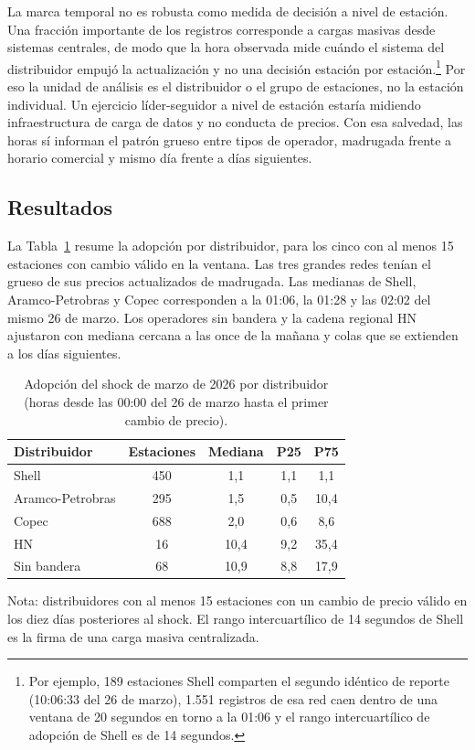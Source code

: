 \documentclass[11pt]{article}
\begin{document}
La marca temporal no es robusta como medida de decisión a nivel de estación.
Una fracción importante de los registros corresponde a cargas masivas desde
sistemas centrales, de modo que la hora observada mide cuándo el sistema del
distribuidor empujó la actualización y no una decisión estación por
estación.\footnote{Por ejemplo, 189 estaciones Shell comparten el segundo
idéntico de reporte (10:06:33 del 26 de marzo), 1.551 registros de esa red
caen dentro de una ventana de 20 segundos en torno a la 01:06 y el rango
intercuartílico de adopción de Shell es de 14 segundos.} Por eso la unidad
de análisis es el distribuidor o el grupo de estaciones, no la estación
individual. Un ejercicio líder-seguidor a nivel de estación estaría midiendo
infraestructura de carga de datos y no conducta de precios. Con esa
salvedad, las horas sí informan el patrón grueso entre tipos de operador,
madrugada frente a horario comercial y mismo día frente a días siguientes.

\subsection{Resultados}
\label{sec:lider_resultados}

La Tabla~\ref{tab:lider_dist} resume la adopción por distribuidor, para los
cinco con al menos 15 estaciones con cambio válido en la ventana. Las tres
grandes redes tenían el grueso de sus precios actualizados de madrugada. Las
medianas de Shell, Aramco-Petrobras y Copec corresponden a la 01:06, la
01:28 y las 02:02 del mismo 26 de marzo. Los operadores sin bandera y la
cadena regional HN ajustaron con mediana cercana a las once de la mañana y
colas que se extienden a los días siguientes.

\begin{table}[htbp]
\centering
\caption{Adopción del shock de marzo de 2026 por distribuidor (horas desde
las 00:00 del 26 de marzo hasta el primer cambio de precio).}
\label{tab:lider_dist}
\begin{tabular}{lcccc}
\toprule
Distribuidor & Estaciones & Mediana & P25 & P75 \\
\midrule
Shell             & 450 & 1,1  & 1,1 & 1,1 \\
Aramco-Petrobras  & 295 & 1,5  & 0,5 & 10,4 \\
Copec             & 688 & 2,0  & 0,6 & 8,6 \\
HN                & 16  & 10,4 & 9,2 & 35,4 \\
Sin bandera       & 68  & 10,9 & 8,8 & 17,9 \\
\bottomrule
\end{tabular}

\medskip
\begin{minipage}{0.85\textwidth}
\footnotesize
Nota: distribuidores con al menos 15 estaciones con un cambio de precio
válido en los diez días posteriores al shock. El rango intercuartílico de 14
segundos de Shell es la firma de una carga masiva centralizada.
\end{minipage}
\end{table}
\end{document}
